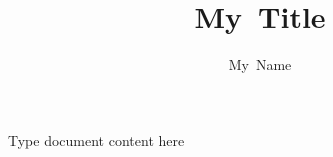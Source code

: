 \documentclass[compress]{beamer}
\title[My Title ]{My~Title}
\author[My~Name]{My~Name}
\begin{document}
Type document content here
\end{document}
